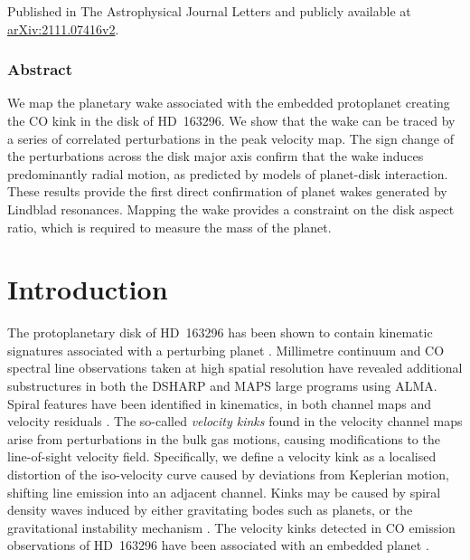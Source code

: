 Published in The Astrophysical Journal Letters \citep{calcino2022} and publicly available at \href{https://arxiv.org/abs/2111.07416v2}{\url{arXiv:2111.07416v2}}.

\subsubsection{Abstract}

We map the planetary wake associated with the embedded protoplanet creating the CO kink in the disk of HD~163296. We show that the wake can be traced by a series of correlated perturbations in the peak velocity map. The sign change of the perturbations across the disk major axis confirm that the wake induces predominantly radial motion, as predicted by models of planet-disk interaction. These results provide the first direct confirmation of planet wakes generated by Lindblad resonances. Mapping the wake provides a constraint on the disk aspect ratio, which is required to measure the mass of the planet.

\section{Introduction}

The protoplanetary disk of HD~163296 has been shown to contain kinematic signatures associated with a perturbing planet \citep{pinte2018a,teague2018}.
Millimetre continuum and CO spectral line observations taken at high spatial resolution have revealed additional substructures in both the DSHARP \citep{andrews2018,huang2018b,pinte2020,izquierdo2021} and MAPS \citep{oberg2021,teague2021} large programs using ALMA.
Spiral features have been identified in kinematics, in both channel maps and velocity residuals \citep{teague2021}.
The so-called \textit{velocity kinks} found in the velocity channel maps arise from perturbations in the bulk gas motions, causing modifications to the line-of-sight velocity field.
Specifically, we define a velocity kink as a localised distortion of the iso-velocity curve caused by deviations from Keplerian motion, shifting line emission into an adjacent channel.
Kinks may be caused by spiral density waves induced by either gravitating bodes such as planets, or the gravitational instability mechanism \citep{hall2020}.
The velocity kinks detected in CO emission observations of HD~163296 have been associated with an embedded planet \citep{pinte2018a}.

